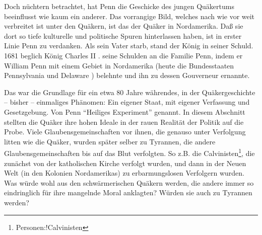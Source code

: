 
\medskip

Doch nüchtern betrachtet, hat Penn die Geschicke des jungen Quäkertums
beeinflusst wie kaum  ein anderer. Das vorrangige Bild, welches nach wie vor weit
verbreitet ist unter den Quäkern, ist das der Quäker in Nordamerika. Daß sie
dort so tiefe kulturelle und politische Spuren hinterlassen haben, ist in erster
Linie Penn zu verdanken. Als sein Vater starb, stand der König in seiner Schuld.
1681 beglich König Charles II . seine
Schulden  an die Familie Penn, indem er William Penn mit einem
Gebiet in Nordamerika (heute die Bundesstaaten Pennsylvania
 und Delaware ) belehnte und ihn
zu dessen Gouverneur ernannte.


Das war die Grundlage für ein etwa 80 Jahre währendes, in der Quäkergeschichte
-- bisher -- einmaliges Phänomen: Ein eigener Staat, mit eigener Verfassung und
Gesetzgebung. Von Penn "`Heiliges Experiment"' genannt. In diesem Abschnitt
stellten die Quäker ihre hohen Ideale in der rauen Realität der Politik auf die
Probe. Viele Glaubensgemeinschaften vor ihnen, die genauso unter Verfolgung
litten wie die Quäker, wurden später selber zu Tyrannen, die andere
Glaubensgemeinschaften bis auf das Blut verfolgten. So z.B. die
Calvinisten\footnote{Personen:!Calvinisten}, die zunächst von der katholischen
Kirche verfolgt wurden, und dann in der Neuen Welt (in den Kolonien
Nordamerikas) zu erbarmungslosen Verfolgern wurden. Was würde wohl aus den
schwärmerischen Quäkern werden, die andere immer so eindringlich für ihre
mangelnde Moral anklagten? Würden sie auch zu Tyrannen werden?


\medskip

